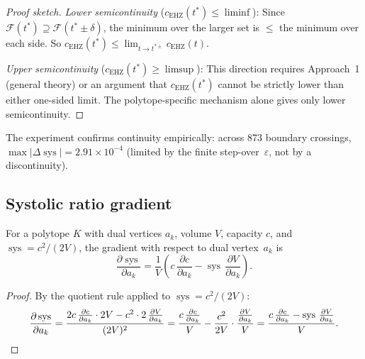 \begin{proof}[Proof sketch]
\emph{Lower semicontinuity} ($c_{\mathrm{EHZ}}(t^*) \le \liminf$):
Since $\mathcal{F}(t^*) \supseteq \mathcal{F}(t^* \pm \delta)$, the minimum
over the larger set is $\le$ the minimum over each side. So
$c_{\mathrm{EHZ}}(t^*) \le \lim_{t \to t^{*\pm}} c_{\mathrm{EHZ}}(t)$.

\emph{Upper semicontinuity} ($c_{\mathrm{EHZ}}(t^*) \ge \limsup$):
This direction requires Approach~1 (general theory) or an argument that
$c_{\mathrm{EHZ}}(t^*)$ cannot be strictly lower than either one-sided limit.
The polytope-specific mechanism alone gives only lower semicontinuity.
\end{proof}

\begin{remark}\label{rem:sys-continuous-empirical}
The experiment confirms continuity empirically: across 873 boundary crossings,
$\max |\Delta\operatorname{sys}| = 2.91 \times 10^{-4}$
(limited by the finite step-over~$\varepsilon$, not by a discontinuity).
\end{remark}

\subsection{Systolic ratio gradient}
\label{sec:sys-gradient}

\begin{lemma}\label{lem:sys-gradient-a}
For a polytope $K$ with dual vertices $a_k$, volume $V$, capacity $c$, and
$\operatorname{sys} = c^2 / (2V)$, the gradient with respect to dual vertex~$a_k$ is
\[
  \frac{\partial \operatorname{sys}}{\partial a_k}
  = \frac{1}{V}\!\left(
    c \, \frac{\partial c}{\partial a_k}
    - \operatorname{sys} \, \frac{\partial V}{\partial a_k}
  \right).
\]
\end{lemma}
\begin{proof}
By the quotient rule applied to $\operatorname{sys} = c^2 / (2V)$:
\[
  \frac{\partial \operatorname{sys}}{\partial a_k}
  = \frac{2c \, \frac{\partial c}{\partial a_k} \cdot 2V
    - c^2 \cdot 2\,\frac{\partial V}{\partial a_k}}{(2V)^2}
  = \frac{c \, \frac{\partial c}{\partial a_k}}{V}
    - \frac{c^2}{2V} \cdot \frac{\frac{\partial V}{\partial a_k}}{V}
  = \frac{c \, \frac{\partial c}{\partial a_k} - \operatorname{sys} \, \frac{\partial V}{\partial a_k}}{V}.
  \qedhere
\]
\end{proof}
